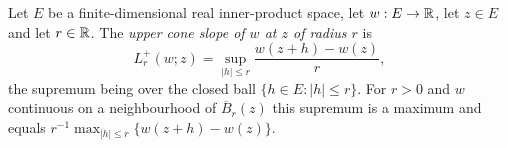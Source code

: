 \begin{definition}
Let $E$ be a finite-dimensional real inner-product space, let $w:E\to\mathbb{R}$, let
$z\in E$ and let $r\in\mathbb{R}$. The \emph{upper cone slope of $w$ at $z$ of radius
$r$} is
\[
  L_r^+(w;z)=\sup_{|h|\le r}\frac{w(z+h)-w(z)}{r},
\]
the supremum being over the closed ball $\{h\in E:|h|\le r\}$. For $r>0$ and $w$
continuous on a neighbourhood of $\overline B_r(z)$ this supremum is a maximum
and equals $r^{-1}\max_{|h|\le r}\{w(z+h)-w(z)\}$.
\end{definition}
